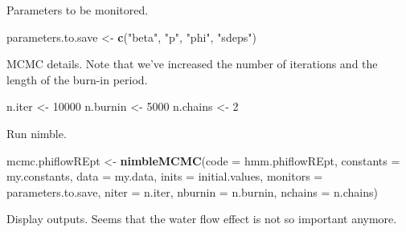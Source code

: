 \documentclass[
  12pt,
]{krantz}
\newenvironment{Shaded}{\begin{snugshade}}{\end{snugshade}}
\newcommand{\AttributeTok}[1]{\textcolor[rgb]{0.13,0.29,0.53}{#1}}
\newcommand{\DecValTok}[1]{\textcolor[rgb]{0.00,0.00,0.81}{#1}}
\newcommand{\FunctionTok}[1]{\textcolor[rgb]{0.13,0.29,0.53}{\textbf{#1}}}
\newcommand{\NormalTok}[1]{#1}
\newcommand{\OtherTok}[1]{\textcolor[rgb]{0.56,0.35,0.01}{#1}}
\newcommand{\StringTok}[1]{\textcolor[rgb]{0.31,0.60,0.02}{#1}}
\begin{document}
Parameters to be monitored.

\begin{Shaded}
\begin{Highlighting}[]
\NormalTok{parameters.to.save }\OtherTok{\textless{}{-}} \FunctionTok{c}\NormalTok{(}\StringTok{"beta"}\NormalTok{, }\StringTok{"p"}\NormalTok{, }\StringTok{"phi"}\NormalTok{, }\StringTok{"sdeps"}\NormalTok{)}
\end{Highlighting}
\end{Shaded}

MCMC details. Note that we've increased the number of iterations and the length of the burn-in period.

\begin{Shaded}
\begin{Highlighting}[]
\NormalTok{n.iter }\OtherTok{\textless{}{-}} \DecValTok{10000}
\NormalTok{n.burnin }\OtherTok{\textless{}{-}} \DecValTok{5000}
\NormalTok{n.chains }\OtherTok{\textless{}{-}} \DecValTok{2}
\end{Highlighting}
\end{Shaded}

Run nimble.

\begin{Shaded}
\begin{Highlighting}[]
\NormalTok{mcmc.phiflowREpt }\OtherTok{\textless{}{-}} \FunctionTok{nimbleMCMC}\NormalTok{(}\AttributeTok{code =}\NormalTok{ hmm.phiflowREpt, }
                             \AttributeTok{constants =}\NormalTok{ my.constants,}
                             \AttributeTok{data =}\NormalTok{ my.data,              }
                             \AttributeTok{inits =}\NormalTok{ initial.values,}
                             \AttributeTok{monitors =}\NormalTok{ parameters.to.save,}
                             \AttributeTok{niter =}\NormalTok{ n.iter,}
                             \AttributeTok{nburnin =}\NormalTok{ n.burnin, }
                             \AttributeTok{nchains =}\NormalTok{ n.chains)}
\end{Highlighting}
\end{Shaded}

Display outputs. Seems that the water flow effect is not so important anymore.
\end{document}
